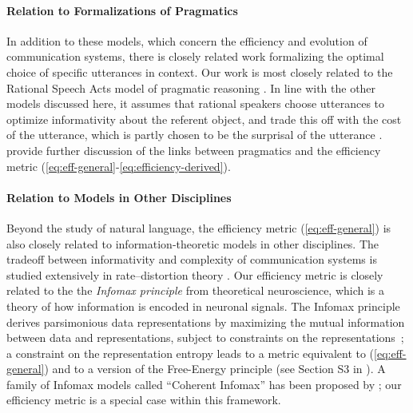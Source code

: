 \documentclass[10pt,twoside,lineno]{article}
\begin{document}
\paragraph{Relation to Formalizations of Pragmatics}
In addition to these models, which concern the efficiency and evolution of communication systems, there is closely related work formalizing the optimal choice of specific utterances in context.
Our work is most closely related to the Rational Speech Acts model of pragmatic reasoning \cite{frank2012predicting,goodman2013knowledge, kao2014nonliteral}.
In line with the other models discussed here, it assumes that rational speakers choose utterances to optimize informativity about the referent object, and trade this off with the cost of the utterance, which is partly chosen to be the surprisal of the utterance \cite{bennett2018extremely, hahn2018information, peloquin2019interactions}.
\citet{peloquin2019interactions} provide further discussion of the links between pragmatics and the efficiency metric (\ref{eq:eff-general}-\ref{eq:efficiency-derived}).

\paragraph{Relation to Models in Other Disciplines}
Beyond the study of natural language, the efficiency metric (\ref{eq:eff-general}) is also closely related to information-theoretic models in other disciplines.
The tradeoff between informativity and complexity of communication systems is studied extensively in rate--distortion theory \cite{berger1971rate}.
Our efficiency metric is closely related to the the \emph{Infomax principle} from theoretical neuroscience, which is a theory of how information is encoded in neuronal signals.
The Infomax principle derives parsimonious data representations by maximizing the mutual information between data and representations, subject to constraints on the representations~\cite{linsker1988self}; a constraint on the representation entropy leads to a metric equivalent to (\ref{eq:eff-general}) and to a version of the Free-Energy principle (see Section S3 in \citet{friston2010free}).
A family of Infomax models called ``Coherent Infomax'' has been proposed by \citet{kay2011coherent}; our efficiency metric is a special case within this framework.


\end{document}
